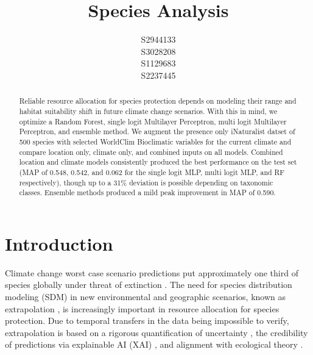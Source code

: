\documentclass{article}
\title{Species Analysis}
\author{
  S2944133\\
  \And
  S3028208\\
 \And
  S1129683\\
 \And
  S2237445\\
}
\begin{document}
\maketitle

\begin{abstract}
 Reliable resource allocation for species protection depends on modeling their range and habitat suitability shift in future climate change scenarios. With this in mind, we optimize a Random Forest, single logit Multilayer Perceptron, multi logit Multilayer Perceptron, and ensemble method. We augment the presence only iNaturalist datset of 500 species with selected WorldClim Bioclimatic variables for the current climate and compare location only, climate only, and combined inputs on all models. Combined location and climate models consistently produced the best performance on the test set (MAP of 0.548, 0.542, and 0.062 for the single logit MLP, multi logit MLP, and RF respectively), though up to a 31\% deviation is possible depending on taxonomic classes. Ensemble methods produced a mild peak improvement in MAP of 0.590.
\end{abstract}


\section{Introduction}\label{intro}

Climate change worst case scenario predictions put approximately one third of species globally under threat of extinction \cite{urban2024climate}. The need for species distribution modeling (SDM) in new environmental and geographic scenarios, known as extrapolation \cite{10.1641/0006-3568}, is increasingly important in resource allocation for species protection. Due to temporal transfers in the data being impossible to verify, extrapolation is based on a rigorous quantification of uncertainty \cite{lange2025feedforwardfewshotspeciesrange}, the credibility of predictions via explainable AI (XAI) \cite{11345587}, and alignment with ecological theory \cite{SERRA2026103563}.

\end{document}
